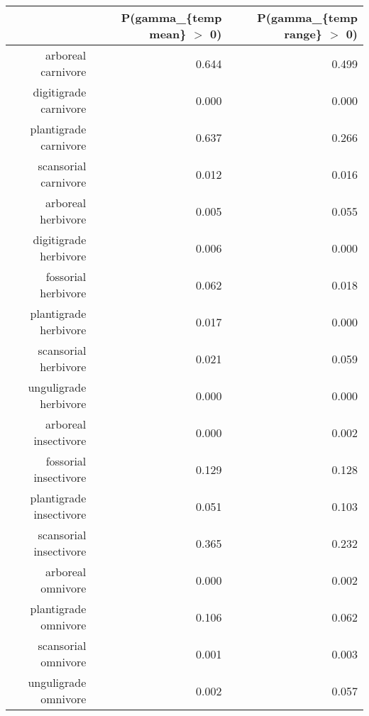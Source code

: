 \begin{table}[ht]
\centering
\begin{tabular}{rrr}
  \hline
 & P(gamma\_\{temp mean\} $>$ 0) & P(gamma\_\{temp range\} $>$ 0) \\ 
  \hline
arboreal carnivore & 0.644 & 0.499 \\ 
  digitigrade carnivore & 0.000 & 0.000 \\ 
  plantigrade carnivore & 0.637 & 0.266 \\ 
  scansorial carnivore & 0.012 & 0.016 \\ 
  arboreal herbivore & 0.005 & 0.055 \\ 
  digitigrade herbivore & 0.006 & 0.000 \\ 
  fossorial herbivore & 0.062 & 0.018 \\ 
  plantigrade herbivore & 0.017 & 0.000 \\ 
  scansorial herbivore & 0.021 & 0.059 \\ 
  unguligrade herbivore & 0.000 & 0.000 \\ 
  arboreal insectivore & 0.000 & 0.002 \\ 
  fossorial insectivore & 0.129 & 0.128 \\ 
  plantigrade insectivore & 0.051 & 0.103 \\ 
  scansorial insectivore & 0.365 & 0.232 \\ 
  arboreal omnivore & 0.000 & 0.002 \\ 
  plantigrade omnivore & 0.106 & 0.062 \\ 
  scansorial omnivore & 0.001 & 0.003 \\ 
  unguligrade omnivore & 0.002 & 0.057 \\ 
   \hline
\end{tabular}
\label{tab:origin_temp}
\end{table}
